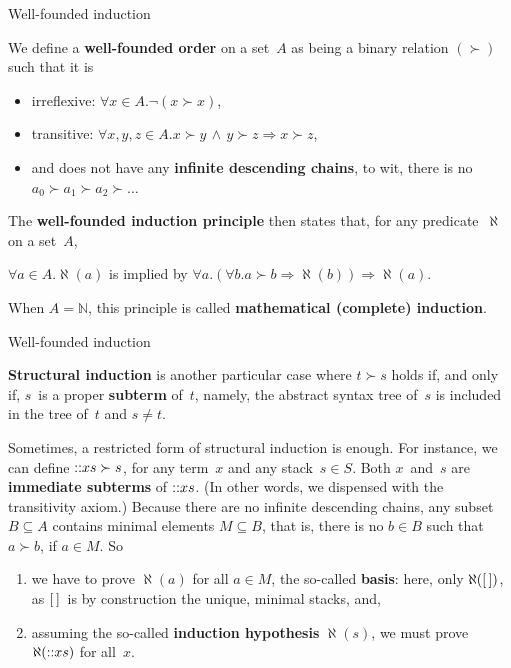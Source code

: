 %
\begin{frame}{Well-founded induction}

We define a \textbf{well\hyp{}founded order} on a set~\(A\) as being a
binary relation \((\succ)\) such that it is
\begin{itemize}

  \item irreflexive: \(\forall x \in A. \neg(x \succ x)\),

  \item transitive: \(\forall x, y, z \in A. x \succ y \,\wedge\, y
    \succ z \Rightarrow x \succ z\),

  \item and does not have any \textbf{infinite descending chains}, to
    wit, there is no \(a_0 \succ a_1 \succ a_2 \succ \dots\)

\end{itemize}
The \textbf{well\hyp{}founded induction principle} then states that, for
any predicate~\(\aleph\) on a set~\(A\),
\begin{center}
  \(\forall a \in A.\aleph(a)\) is implied by \(\forall a.(\forall b.a
  \succ b \Rightarrow \aleph(b)) \Rightarrow \aleph(a)\).
\end{center}
When \(A=\mathbb{N}\), this principle is called \textbf{mathematical
(complete) induction}.

\end{frame}

%
\begin{frame}{Well-founded induction}

\textbf{Structural induction} is another particular case where \(t \succ
s\) holds if, and only if, \(s\)~is a proper \textbf{subterm} of~\(t\),
namely, the abstract syntax tree of~\(s\) is included in the tree
of~\(t\) and \(s \neq t\).

\bigskip

Sometimes, a restricted form of structural induction is enough. For
instance, we can define \(\textsf{::}{x}{s} \succ s\), for any term~\(x\)
and any stack~\(s \in S\). Both \(x\)~and~\(s\) are \textbf{immediate
subterms} of \(\textsf{::}{x}{s}\). (In other words, we dispensed with the
transitivity axiom.) Because there are no infinite descending chains,
any subset \(B \subseteq A\) contains minimal elements \(M \subseteq
B\), that is, there is no \(b \in B\) such that \(a \succ b\), if \(a
\in M\). So
\begin{enumerate}

  \item we have to prove \(\aleph(a)\) for all \(a \in M\), the
    so\hyp{}called \textbf{basis}: here, only \(\aleph([\,])\), as
    \([\,]\)~is by construction the unique, minimal stacks, and,

  \item assuming the so\hyp{}called \textbf{induction hypothesis}
    \(\aleph(s)\), we must prove \(\aleph(\textsf{::}{x}{s})\) for
    all~\(x\).

\end{enumerate}

\end{frame}
